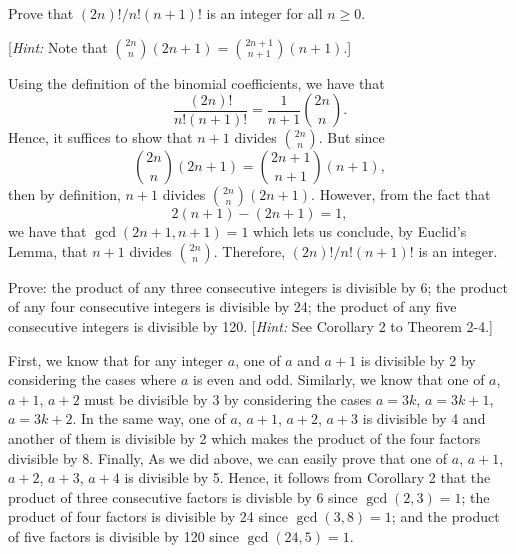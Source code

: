 \begin{exercise}
    Prove that $(2n)!/n!(n+1)!$ is an integer for all $n \geq 0$.

    [\textit{Hint:} Note that $\displaystyle \binom{2n }{n }(2n+1) = \binom{2n+1}{n+1}(n+1).$] \\
\end{exercise}

\begin{solution}
    Using the definition of the binomial coefficients, we have that 
    $$\frac{(2n)!}{n!(n+1)!} = \frac{1}{n+1}\binom{2n}{n }.$$
    Hence, it suffices to show that $n+1$ divides $\displaystyle \binom{2n}{n }$. But since
    $$\binom{2n}{n }(2n+1) = \binom{2n+1}{n+1}(n+1),$$
    then by definition, $n+1$ divides $\displaystyle \binom{2n}{n }(2n+1)$. However, from the fact that
    $$2(n+1) - (2n+1) = 1,$$
    we have that $\gcd(2n+1, n+1) = 1$ which lets us conclude, by Euclid's Lemma, that $n+1$ divides $\displaystyle \binom{2n }{n}$. Therefore, $(2n)!/n!(n+1)!$ is an integer. \\
\end{solution}

\begin{exercise}
    Prove: the product of any three consecutive integers is divisible by 6; the product of any four consecutive integers is divisible by 24; the product of any five consecutive integers is divisible by 120. [\textit{Hint:} See Corollary 2 to Theorem 2-4.]\\
\end{exercise}

\begin{solution}
    First, we know that for any integer $a$, one of $a$ and $a+1$ is divisible by 2 by considering the cases where $a$ is even and odd. Similarly, we know that one of $a$, $a+1$, $a+2$ must be divisible by 3 by considering the cases $a = 3k$, $a = 3k+1$, $a = 3k+2$. In the same way, one of $a$, $a+1$, $a+2$, $a+3$ is divisible by 4 and another of them is divisible by 2 which makes the product of the four factors divisible by 8. Finally, As we did above, we can easily prove that one of $a$, $a+1$, $a+2$, $a+3$, $a+4$ is divisible by 5. Hence, it follows from Corollary 2 that the product of three consecutive factors is divisble by 6 since $\gcd(2, 3) = 1$; the product of four factors is divisible by 24 since $\gcd(3, 8) = 1$; and the product of five factors is divisible by 120 since $\gcd(24, 5) = 1$. \\
\end{solution}

